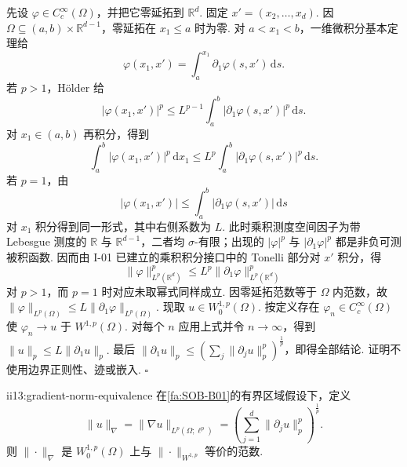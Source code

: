 \begin{FAProof}
先设 \(\displaystyle\varphi\in C_c^\infty(\Omega)\)，并把它零延拓到 \(\displaystyle\mathbb R^d\). 固定 \(\displaystyle x'=(x_2,\dots,x_d)\). 因 \(\displaystyle\Omega\subseteq(a,b)\times\mathbb R^{d-1}\)，零延拓在 \(\displaystyle x_1\leqslant a\) 时为零. 对 \(\displaystyle a<x_1<b\)，一维微积分基本定理给
\[
\varphi(x_1,x')
=
\int_a^{x_1}\partial_1\varphi(s,x')\,\mathrm{d}s.
\]
若 \(\displaystyle p>1\)，Hölder 给
\[
|\varphi(x_1,x')|^p
\leqslant
L^{p-1}
\int_a^b|\partial_1\varphi(s,x')|^p\,\mathrm{d}s.
\]
对 \(\displaystyle x_1\in(a,b)\) 再积分，得到
\[
\int_a^b|\varphi(x_1,x')|^p\,\mathrm{d}x_1
\leqslant
L^p
\int_a^b|\partial_1\varphi(s,x')|^p\,\mathrm{d}s.
\]
若 \(\displaystyle p=1\)，由
\[
|\varphi(x_1,x')|
\leqslant
\int_a^b|\partial_1\varphi(s,x')|\,\mathrm{d}s
\]
对 \(\displaystyle x_1\) 积分得到同一形式，其中右侧系数为 \(\displaystyle L\). 此时乘积测度空间因子为带 Lebesgue 测度的 \(\displaystyle\mathbb R\) 与 \(\displaystyle\mathbb R^{d-1}\)，二者均 \(\displaystyle\sigma\)-有限；出现的 \(\displaystyle|\varphi|^p\) 与 \(\displaystyle|\partial_1\varphi|^p\) 都是非负可测被积函数. 因而由 I-01 已建立的乘积积分接口中的 Tonelli 部分对 \(\displaystyle x'\) 积分，得
\[
\|\varphi\|_{L^p(\mathbb R^d)}^p \leqslant L^p\|\partial_1\varphi\|_{L^p(\mathbb R^d)}^p
\]
对 \(\displaystyle p>1\)，而 \(\displaystyle p=1\) 时对应未取幂式同样成立. 因零延拓范数等于 \(\displaystyle\Omega\) 内范数，故
\(\displaystyle \|\varphi\|_{L^p(\Omega)} \leqslant L\|\partial_1\varphi\|_{L^p(\Omega)}.\)
现取 \(\displaystyle u\in W_0^{1,p}(\Omega)\). 按定义存在 \(\displaystyle\varphi_n\in C_c^\infty(\Omega)\) 使 \(\displaystyle\varphi_n\to u\) 于 \(\displaystyle W^{1,p}(\Omega)\). 对每个 \(\displaystyle n\) 应用上式并令 \(\displaystyle n\to\infty\)，得到 \(\displaystyle \|u\|_p \leqslant L\|\partial_1u\|_p.\)
最后 \(\displaystyle\|\partial_1u\|_p\leqslant(\sum_j\|\partial_ju\|_p^p)^{\frac{1}{p}}\)，即得全部结论. 证明不使用边界正则性、迹或嵌入.
\hfill\(\square\)
\end{FAProof}

\begin{FACorollary}{ii13:gradient-norm-equivalence}
在\autoref{fa:SOB-B01}的有界区域假设下，定义
\[
\|u\|_\nabla
=
\|\nabla u\|_{L^p(\Omega;\ell^p)}
=
\left(\sum_{j=1}^d\|\partial_ju\|_p^p\right)^{\frac{1}{p}}.
\]
则 \(\displaystyle\|\cdot\|_\nabla\) 是 \(\displaystyle W_0^{1,p}(\Omega)\) 上与 \(\displaystyle\|\cdot\|_{W^{1,p}}\) 等价的范数.
\end{FACorollary}


